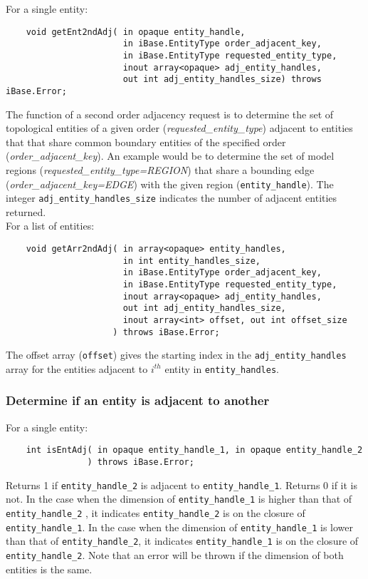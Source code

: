 \documentclass{article}
\begin{document}
\hspace{-16pt}For a single entity:
\begin{verbatim}
    void getEnt2ndAdj( in opaque entity_handle, 
                       in iBase.EntityType order_adjacent_key,
                       in iBase.EntityType requested_entity_type, 
                       inout array<opaque> adj_entity_handles, 
                       out int adj_entity_handles_size) throws iBase.Error;
\end{verbatim}

The function of a second order adjacency request is to determine 
the set of topological entities of a given order (\textit{requested\_entity\_type}) 
adjacent to entities that that share common boundary entities 
of the specified order (\textit{order\_adjacent\_key}). An example 
would be to determine the set of model regions (\textit{requested\_entity\_type=REGION})
that share a bounding edge (\textit{order\_adjacent\_key=EDGE}) with 
the given region ({\tt entity\_handle}). The integer {\tt adj\_entity\_handles\_size} indicates 
the number of adjacent entities returned. \\

\hspace{-16pt}For a list of entities:

\begin{verbatim}
    void getArr2ndAdj( in array<opaque> entity_handles, 
                       in int entity_handles_size, 
                       in iBase.EntityType order_adjacent_key, 
                       in iBase.EntityType requested_entity_type, 
                       inout array<opaque> adj_entity_handles, 
                       out int adj_entity_handles_size, 
                       inout array<int> offset, out int offset_size
                     ) throws iBase.Error;
\end{verbatim}
The offset array ({\tt offset}) gives the starting index in the
{\tt adj\_entity\_handles} array for the entities adjacent to $i^{th}$
entity in {\tt entity\_handles}.

\subsubsection{Determine if an entity is adjacent to another}
For a single entity:

\begin{verbatim}
    int isEntAdj( in opaque entity_handle_1, in opaque entity_handle_2
                ) throws iBase.Error;
\end{verbatim}
Returns 1 if {\tt entity\_handle\_2} is adjacent to {\tt entity\_handle\_1}. 
Returns 0 if it is not. In the case when the dimension of {\tt entity\_handle\_1} is 
higher than that of {\tt entity\_handle\_2} , it indicates {\tt entity\_handle\_2} is 
on the closure of {\tt entity\_handle\_1}. In the case when 
the dimension of {\tt entity\_handle\_1} is lower than that of {\tt entity\_handle\_2}, it 
indicates {\tt entity\_handle\_1} is on the closure of {\tt entity\_handle\_2}. 
Note that an error will be thrown if the dimension of both entities 
is the same.\\
\end{document}
